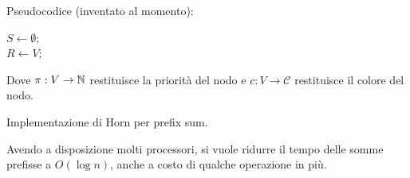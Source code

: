 \begin{questions}
\begin{solution}
        Pseudocodice (inventato al momento):
        \begin{center}
            \begin{minipage}{.7\textwidth}
                \begin{tcolorbox}[
                    colback=white,
                    sharp corners,
                    boxrule=.3mm,
                    left=20pt,
                    top=0pt,
                    bottom=0pt,
                    colbacktitle=white,
                    coltitle=black
                    ]
                    \LinesNumbered
                    \begin{algorithm}[H]
                        \SetAlgoNoEnd
                        $S \leftarrow \emptyset$; \\
                        $R \leftarrow V$;  \\
                    \end{algorithm}
                \end{tcolorbox}
            \end{minipage}
        \end{center}
        
        Dove $\pi: V \rightarrow \mathbb{N}$ restituisce la priorità del nodo e $c: V \rightarrow \mathcal{C}$ restituisce il colore del nodo.
    \end{solution}
    
    \question Implementazione di Horn per prefix sum.
    
    \begin{solution}
        Avendo a disposizione molti processori, si vuole ridurre il tempo delle somme prefisse a $O(\log n)$, anche a costo di qualche operazione in più.
        

\end{solution}
\end{questions}
